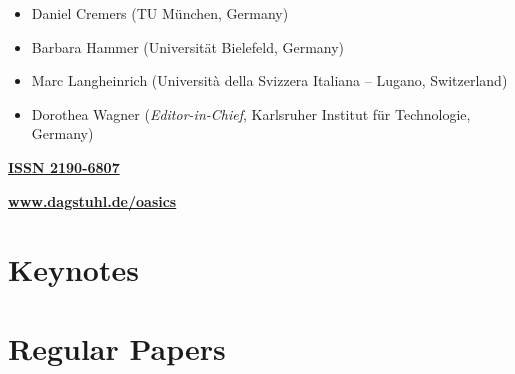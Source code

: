 \documentclass[a4paper,UKenglish]{oasicsmaster}
\begin{document}
\begin{publicationinfo}
\begin{itemize}
\item Daniel Cremers (TU M\"unchen, Germany)
\item Barbara Hammer (Universit\"at Bielefeld, Germany)
\item Marc Langheinrich (Universit\`a della Svizzera Italiana -- Lugano, Switzerland)
\item Dorothea Wagner (\emph{Editor-in-Chief}, Karlsruher Institut f\"{u}r Technologie, Germany)
 \end{itemize}


 \bigskip
 \bigskip
 \bigskip


{\large\bf\sffamily \href{http://drops.dagstuhl.de/oasics}{ISSN 2190-6807}}

 \bigskip
 \bigskip
 \bigskip

{\Large\bf\sffamily \href{http://www.dagstuhl.de/oasics}{www.dagstuhl.de/oasics}}
 
 \vfill
 
 \newpage
 
 \thispagestyle{empty}
 
\end{publicationinfo}




\begin{contentslist}

% 
% 


\part{Keynotes}


\part{Regular Papers}



\end{contentslist}
\end{document}
